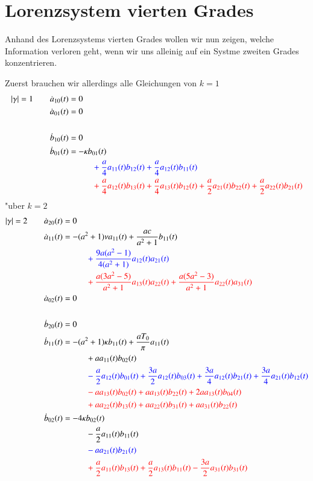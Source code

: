 \section{Lorenzsystem vierten Grades}
Anhand des Lorenzsystems vierten Grades wollen wir nun zeigen, welche 
Information verloren geht, wenn wir uns alleinig auf ein Systme zweiten Grades 
konzentrieren.

Zuerst brauchen wir allerdings alle Gleichungen von $k = 1$
\begin{align*}
|\gamma| = 1
\qquad &
\dot{a}_{10}(t) = 0
\\
&
\dot{a}_{01}(t) = 0
\\
\\
&
\dot{b}_{10}(t) = 0
\\
&
\dot{b}_{01}(t)
=
-
\kappa
b_{01}(t)
\\
&\phantom{aaaaaaaaaa}
\color{blue}
+
\frac{a}{4} a_{11}(t) b_{12}(t)
+
\frac{a}{4} a_{12}(t) b_{11}(t)
\\
&\phantom{aaaaaaaaaa}
\color{red}
+
\frac{a}{4} a_{12}(t) b_{13}(t)
+
\frac{a}{4} a_{13}(t) b_{12}(t)
+
\frac{a}{2} a_{21}(t) b_{22}(t)
+
\frac{a}{2} a_{22}(t) b_{21}(t)
\end{align*}
"uber $k = 2$
\begin{align*}
|\gamma| = 2
\qquad &
\dot{a}_{20}(t) = 0
\\
&
\dot{a}_{11}(t)
=
-
(a^2+1)
\nu
a_{11}(t)
+
\frac{a c}{a^2+1} b_{11}(t)
\\
&\phantom{aaaaaaaaaa}
\color{blue}
+
\frac{9 a (a^2 - 1)}{4 (a^2+1)} a_{12}(t) a_{21}(t)
\\
&\phantom{aaaaaaaaaa}
\color{red}
+
\frac{a (3 a^2 - 5)}{a^2+1} a_{13}(t) a_{22}(t)
+
\frac{a (5 a^2 - 3)}{a^2+1} a_{22}(t) a_{31}(t)
\\
&
\dot{a}_{02}(t) = 0
\\
\\
&
\dot{b}_{20}(t) = 0
\\
&
\dot{b}_{11}(t)
=
-
(a^2+1)
\kappa
b_{11}(t)
+
\frac{a T_{0}}{\pi} a_{11}(t)
\\
&\phantom{aaaaaaaaaa}
+
a
a_{11}(t) b_{02}(t)
\\
&\phantom{aaaaaaaaaa}
\color{blue}
-
\frac{a}{2} a_{12}(t) b_{01}(t)
+
\frac{3 a}{2} a_{12}(t) b_{03}(t)
+
\frac{3 a}{4} a_{12}(t) b_{21}(t)
+
\frac{3 a}{4} a_{21}(t) b_{12}(t)
\\
&\phantom{aaaaaaaaaa}
\color{red}
-
a
a_{13}(t) b_{02}(t)
+
a
a_{13}(t) b_{22}(t)
+
2 a
a_{13}(t) b_{04}(t)
\\
&\phantom{aaaaaaaaaa}
\color{red}
+
a
a_{22}(t) b_{13}(t)
+
a
a_{22}(t) b_{31}(t)
+
a
a_{31}(t) b_{22}(t)
\\
&
\dot{b}_{02}(t)
=
-
4
\kappa
b_{02}(t)
\\
&\phantom{aaaaaaaaaa}
-
\frac{a}{2} a_{11}(t) b_{11}(t)
\\
&\phantom{aaaaaaaaaa}
\color{blue}
-
a
a_{21}(t) b_{21}(t)
\\
&\phantom{aaaaaaaaaa}
\color{red}
+
\frac{a}{2} a_{11}(t) b_{13}(t)
+
\frac{a}{2} a_{13}(t) b_{11}(t)
-
\frac{3 a}{2} a_{31}(t) b_{31}(t)
\end{align*}
